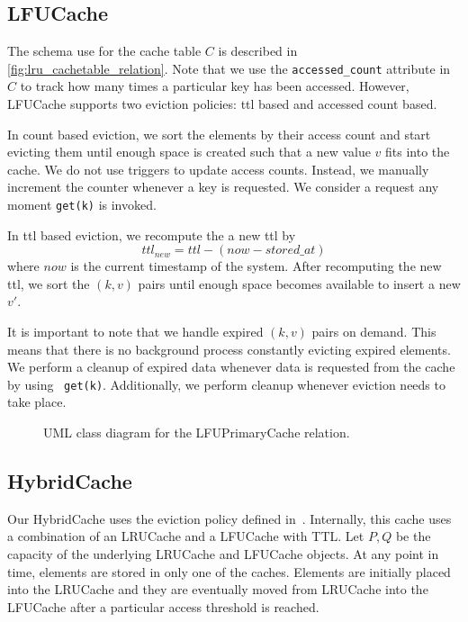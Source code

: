 \subsection{LFUCache\label{sec:lfu}}
The schema use for the cache table $C$ is
described in \autoref{fig:lru_cachetable_relation}.
Note that we use the \texttt{accessed\_count} attribute
in $C$ to track how many times a particular key
has been accessed. However, LFUCache supports two eviction
policies: ttl based and accessed count based.

In count based eviction,
we sort the elements by their access count and
start evicting them until enough space is created
such that a new value $v$ fits into the cache.
We do not use triggers to update access counts. Instead,
we manually increment the counter whenever a key is requested.
We consider a request any moment \texttt{get(k)} is invoked.

In ttl based eviction,
we recompute the a new ttl by
\[
ttl_{new} = ttl - (now - stored\_at)
\]
where $now$ is the current timestamp of the system.
After recomputing the new ttl, we sort the $(k, v)$
pairs until enough space becomes available to insert a new $v'$.

It is important to note that we handle expired $(k, v)$ pairs
on demand. This means that there is no background process
constantly evicting expired elements. We perform
a cleanup of expired data whenever data is requested
from the cache by using ~\texttt{get(k)}. Additionally,
we perform cleanup whenever eviction needs to take place.

\begin{figure}[!htp]
    \centering
    \caption{UML class diagram for the LFUPrimaryCache relation.}
    \label{fig:lfu_cachetable_relation}
\end{figure}


\subsection{HybridCache\label{sec:hybrid}}
Our HybridCache uses the eviction 
policy defined in~\cite{shah2023ImprovedCacheEviction}.
Internally, this cache uses a combination of an LRUCache and a
LFUCache with TTL. Let $P, Q$ be the capacity
of the underlying LRUCache and LFUCache objects.
At any point in time, elements are stored in only
one of the caches. Elements are initially placed
into the LRUCache and they are eventually moved
from LRUCache into the LFUCache after a particular
access threshold is reached.

